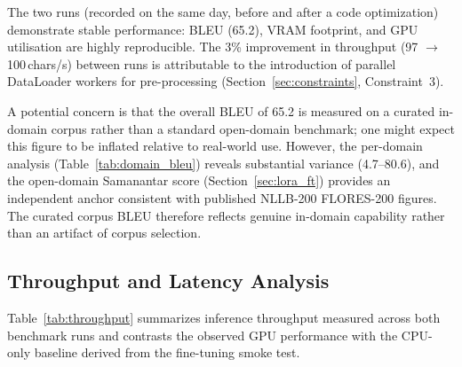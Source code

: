 \documentclass[conference]{IEEEtran}
\begin{document}
The two runs (recorded on the same day, before and after a code optimization)
demonstrate stable performance: BLEU (65.2), VRAM footprint, and GPU utilisation are
highly reproducible. The 3\% improvement in throughput (97 $\to$ 100\,chars/s)
between runs is attributable to the introduction of parallel DataLoader workers
for pre-processing (Section~\ref{sec:constraints}, Constraint~3).

A potential concern is that the overall BLEU of 65.2 is measured on a curated
in-domain corpus rather than a standard open-domain benchmark; one might expect
this figure to be inflated relative to real-world use.
However, the per-domain analysis (Table~\ref{tab:domain_bleu}) reveals substantial
variance (4.7--80.6), and the open-domain Samanantar score (Section~\ref{sec:lora_ft}) provides
an independent anchor consistent with published NLLB-200 FLORES-200 figures.
The curated corpus BLEU therefore reflects genuine in-domain capability rather than
an artifact of corpus selection.

\subsection{Throughput and Latency Analysis}

Table~\ref{tab:throughput} summarizes inference throughput measured across both
benchmark runs and contrasts the observed GPU performance with the CPU-only baseline
derived from the fine-tuning smoke test.

\begin{table}[htbp]
\caption{Inference Throughput and Latency --- NLLB-200-distilled-600M.}
\label{tab:throughput}
\centering
{}
\end{table}
\end{document}

